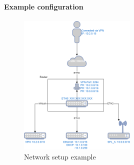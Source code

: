 \paragraph{Example configuration}
\label{sec:example_configuration}

\begin{figure}[ht!]
    \centering
    \includegraphics[width=0.5\textwidth]{figs/network.png}
    \caption{Network setup example}
\end{figure}

